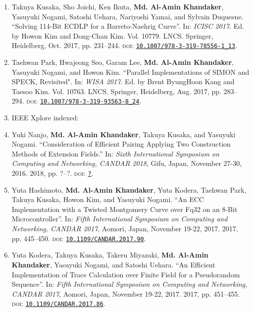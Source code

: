 \begin{enumerate}
	\item Takuya Kusaka, Sho Joichi, Ken Ikuta, \textbf{Md. Al-Amin Khandaker}, \\ Yasuyuki Nogami, Satoshi Uehara, Nariyoshi Yamai, and Sylvain Duquesne. ``Solving 114-Bit ECDLP for a Barreto-Naehrig Curve''. In: \textit{ICISC 2017}. Ed. by Howon Kim and Dong-Chan Kim. Vol. 10779. LNCS. Springer, Heidelberg, Oct. 2017, pp. 231–244. \textsc{doi}: \href{https://doi.org/10.1007/978-3-319-78556-1_13}{\texttt{10.1007/978-3-319-78556-1\_13}}.
	
	\item  Taehwan Park, Hwajeong Seo, Garam Lee,\textbf{ Md. Al-Amin Khandaker}, \\Yasuyuki Nogami, and Howon Kim. ``Parallel Implementations of SIMON and SPECK, Revisited". In: \textit{WISA 2017}. Ed. by Brent ByungHoon Kang and Taesoo Kim. Vol. 10763. LNCS. Springer, Heidelberg, Aug. 2017, pp. 283–294. \textsc{doi}: \href{https://doi.org/10.1007/978-3-319-93563-8_24}{\texttt{10.1007/978-3-319-93563-8\_24}}.  
	
		\vspace{5mm}
	\item[ ] \Large IEEE Xplore indexed:
	\normalsize
	
		\item Yuki Nanjo, \textbf{Md. Al-Amin Khandaker}, Takuya Kusaka, and Yasuyuki Nogami. ``Consideration of Efficient Pairing Applying Two Construction Methods of Extension Fields.'' In:  \textit{Sixth International Symposium on Computing and Networking, CANDAR 2018}, Gifu, Japan, November 27-30, 2016. 2018, pp. ?–?. \textsc{doi}: \href{_}{\texttt{?}}.

	
	\item Yuta Hashimoto, \textbf{Md. Al-Amin Khandaker}, Yuta Kodera, Taehwan Park, Takuya Kusaka, Howon Kim, and Yasuyuki Nogami. ``An ECC Implementation with a Twisted Montgomery Curve over Fq32 on an 8-Bit Microcontroller''. In: \textit{Fifth International Symposium on Computing and Networking, CANDAR 2017}, Aomori, Japan, November 19-22, 2017. 2017, pp. 445–450. \textsc{doi}: \href{https://doi.org/10.1109/CANDAR.2017.90}{\texttt{10.1109/CANDAR.2017.90}}.
	

   \item	Yuta Kodera, Takuya Kusaka, Takeru Miyazaki, \textbf{Md. Al-Amin Khandaker}, Yasuyuki Nogami, and Satoshi Uehara. ``An Efficient Implementation of Trace Calculation over Finite Field for a Pseudorandom Sequence''. In: \textit{Fifth International Symposium on Computing and Networking, CANDAR 2017}, Aomori, Japan, November 19-22, 2017. 2017, pp. 451–455. \textsc{doi}: \href{https://doi.org/10.1109/CANDAR.2017.86}{\texttt{10.1109/CANDAR.2017.86}}.
   

\end{enumerate}
